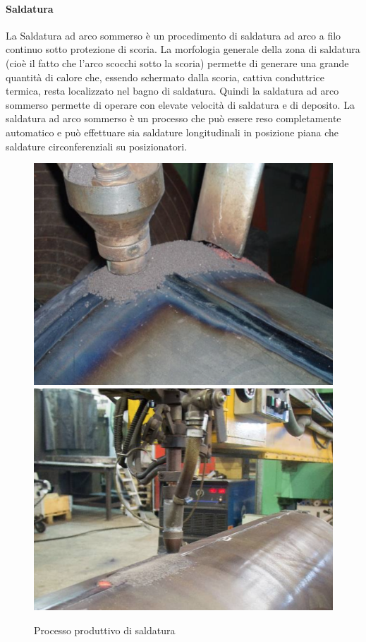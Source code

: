 \paragraph{Saldatura} La Saldatura ad arco sommerso è un procedimento di saldatura ad arco a filo continuo sotto protezione di scoria. La morfologia generale della zona di saldatura (cioè il fatto che l'arco scocchi sotto la scoria) permette di generare una grande quantità di calore che, essendo schermato dalla scoria, cattiva conduttrice termica, resta localizzato nel bagno di saldatura. Quindi la saldatura ad arco sommerso permette di operare con elevate velocità di saldatura e di deposito. La saldatura ad arco sommerso è un processo che può essere reso completamente automatico e può effettuare sia saldature longitudinali in posizione piana che saldature circonferenziali su posizionatori.
\begin{figure}[h]
    \centering
    \includegraphics[scale=0.22]{Immagini/Saldatura1.png}
    \includegraphics[scale=0.22]{Immagini/Saldatura2.png}
    \caption{Processo produttivo di saldatura}
    \label{fig:Saldatura}
\end{figure}
